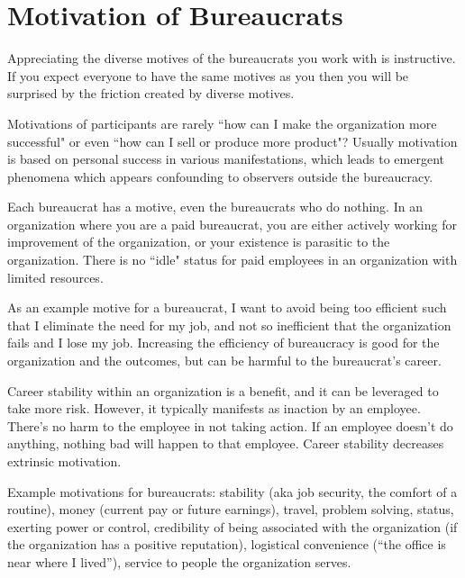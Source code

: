 \section{Motivation of Bureaucrats\label{sec:motivations}}

Appreciating the diverse motives of the bureaucrats you work with is instructive. If you expect everyone to have the same motives as you then you will be surprised by the friction created by diverse motives. 

Motivations of participants are rarely ``how can I make the organization more successful" or even ``how can I sell or produce more product"? Usually motivation is based on personal success in various manifestations, which leads to emergent phenomena which appears confounding to observers outside the bureaucracy. 



Each bureaucrat has a motive, even the bureaucrats who do nothing. 
In an organization where you are a paid bureaucrat, you are either actively working for improvement of the organization, or your existence is parasitic to the organization. There is no ``idle" status for paid employees in an organization with limited resources.

As an example motive for a bureaucrat, I want to avoid being too efficient such that I eliminate the need for my job, and not so inefficient that the organization fails and I lose my job. Increasing the efficiency of bureaucracy is good for the organization and the outcomes, but can be harmful to the bureaucrat's career.

Career stability within an organization is a benefit, and it can be leveraged to take more risk. However, it typically manifests as inaction by an employee. There's no harm to the employee in not taking action. If an employee doesn't do anything, nothing bad will happen to that employee. Career stability decreases extrinsic motivation.


Example motivations for bureaucrats: 
stability (aka job security, the comfort of a routine),
money (current pay or future earnings), 
travel, 
problem solving, 
status, 
exerting power or control, 
credibility of being associated with the organization (if the organization has a positive reputation), 
logistical convenience (``the office is near where I lived''), 
service to people the organization serves.



